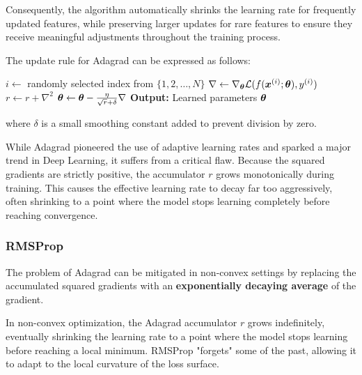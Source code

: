 Consequently, the algorithm automatically shrinks the learning rate for frequently updated features, 
while preserving larger updates for rare features to ensure they receive meaningful adjustments throughout the training process.

The update rule for Adagrad can be expressed as follows:
\begin{algorithm}[H]
    \caption{Adagrad}
    \begin{algorithmic}[1]
            \State $i \leftarrow$ randomly selected index from $\{1, 2, \ldots, N\}$
            \State $\nabla \leftarrow \nabla_{\boldsymbol{\theta}} \mathcal{L}(f(\boldsymbol{x}^{(i)}; \boldsymbol{\theta}), y^{(i)})$
            \State $r \leftarrow r + \nabla^2$
            \State $\boldsymbol{\theta} \leftarrow \boldsymbol{\theta} - \frac{\eta}{\sqrt{r} + \delta} \nabla$
        \EndWhile
        \State \textbf{Output:} Learned parameters $\boldsymbol{\theta}$
    \end{algorithmic}
\end{algorithm}
where $\delta$ is a small smoothing constant added to prevent division by zero.

While Adagrad pioneered the use of adaptive learning rates and sparked a major trend in Deep Learning, it suffers from a critical flaw.
Because the squared gradients are strictly positive, the accumulator $r$ grows monotonically during training.
This causes the effective learning rate to decay far too aggressively, often shrinking to a point where the model stops learning completely before reaching convergence.

\subsubsection{RMSProp}
The problem of Adagrad can be mitigated in non-convex settings by replacing the accumulated squared gradients with
an \textbf{exponentially decaying average} of the gradient.

In non-convex optimization, the Adagrad accumulator $r$ grows indefinitely, eventually shrinking the learning rate to a point
where the model stops learning before reaching a local minimum. RMSProp "forgets" some of the past, allowing it to adapt
to the local curvature of the loss surface.

